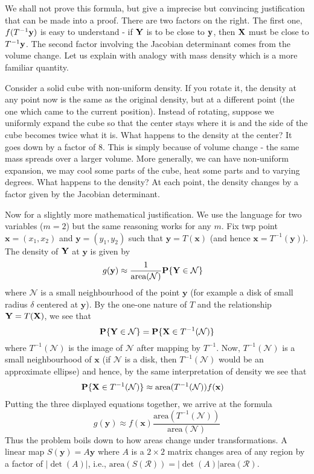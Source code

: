 \documentclass[preprint,  11pt]{amsart}
\newcommand{\para}[1]{\vspace{4mm}\noindent{\bfseries #1:}}
\theoremstyle{plain} %
\theoremstyle{definition} %
\begin{document}
\para{Justification} We shall not prove this formula, but give a imprecise but convincing justification that can be made into a proof. There are two factors on the right.  The first one, $f(T^{-1}{\bf y})$ is easy to understand - if ${\bf Y}$ is to be close to ${\bf y}$, then ${\bf X}$ must be close to $T^{-1}{\bf y}$. The second factor involving the Jacobian determinant comes from the volume change. Let us explain with analogy with mass density which is a more familiar quantity.

Consider a solid cube with non-uniform density. If you rotate it, the density at any point now is the same as the original density, but at a different point (the one which came to the current position). Instead of rotating, suppose we uniformly expand the cube so that the center stays where it is and the side of the cube becomes twice what it is. What happens to the density at the center? It goes down by a factor of $8$. This is simply because of volume change - the same mass spreads over a larger volume. More generally, we can have non-uniform expansion, we may cool some parts of the cube, heat some parts and to varying degrees. What happens to the density? At each point, the density changes by a factor given by the Jacobian determinant.

Now for a slightly more mathematical justification. We use the language for two variables ($m=2$) but the same reasoning works for any $m$. Fix twp point $\mathbf{x}=(x_{1},x_{2})$ and $\mathbf{y}=(y_{1},y_{2})$ such that $\mathbf{y}=T(\mathbf{x})$ (and hence $\mathbf{x}=T^{-1}(\mathbf{y})$). The density of ${\bf Y}$ at $\mathbf{y}$ is given by 
\begin{align*} 
g(\mathbf{y})&\approx \frac{1}{\mbox{area}(\mathcal N)}\mathbf{P}\{{\bf Y}\in \mathcal N\}
\end{align*}
where $\mathcal N$ is a small neighbourhood of the point $\mathbf{y}$ (for example a disk of small radius $\delta$ centered at $\mathbf{y}$). By the one-one nature of $T$ and the relationship ${\bf Y}=T({\bf X})$, we see that $$\mathbf{P}\{{\bf Y}\in \mathcal N\}=\mathbf{P}\{{\bf X}\in T^{-1}(\mathcal N)\}$$ where $T^{-1}(\mathcal N)$ is the image of $\mathcal N$ after mapping by $T^{-1}$.  Now, $T^{-1}(\mathcal N)$ is a small neighbourhood of $\mathbf{x}$ (if $\mathcal N$ is a disk, then $T^{-1}(\mathcal N)$ would be an approximate ellipse) and hence, by the same interpretation of density we see that
\begin{align*} 
\mathbf{P}\{{\bf X}\in T^{-1}(\mathcal N)\}&\approx \mbox{area}(T^{-1}(\mathcal N))f(\mathbf{x})
\end{align*}
Putting the three displayed equations together, we arrive at the formula
$$
g(\mathbf{y})\approx f(\mathbf{x})\frac{\mbox{area}(T^{-1}(\mathcal N))}{\mbox{area}(\mathcal N)}
$$
Thus the problem boils down to how areas change under transformations. A linear map $S(\mathbf{y})=A\mathbf{y}$ where $A$ is a $2\times 2$ matrix changes area of any region by a factor of $|\det(A)|$, i.e., $\mbox{area}(S(\mathcal R))=|\det(A)|\mbox{area}(\mathcal R)$. 
\end{document}
